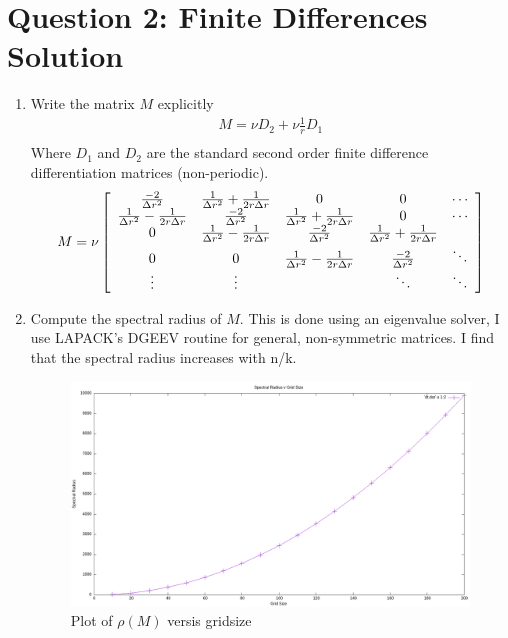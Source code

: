 \documentclass{article}
\begin{document}
\section*{Question 2: Finite Differences Solution}
\begin{enumerate}[label=\alph*)]

    \item Write the matrix $M$ explicitly
    \begin{align*}
        M = \nu D_2 + \nu \frac{1}{r}D_1\\
    \end{align*}
    Where $D_1$ and $D_2$ are the standard second order finite difference
    differentiation matrices (non-periodic).
    \begin{align*}
        M = \nu\left[\begin{array}{c c c c c}
            \frac{-2}{\Delta r^2} & \frac{1}{\Delta r^2} + \frac{1}{2r\Delta r} &
            0 & 0 & \cdots  \\
            \frac{1}{\Delta r^2} - \frac{1}{2r\Delta r} &
            \frac{-2}{\Delta r^2} & \frac{1}{\Delta r^2} + \frac{1}{2r\Delta r} &
            0  & \cdots \\
            0 & \frac{1}{\Delta r^2} - \frac{1}{2r\Delta r} &
            \frac{-2}{\Delta r^2} & \frac{1}{\Delta r^2} + \frac{1}{2r\Delta r} &
             \\
            0 & 0 &\frac{1}{\Delta r^2} - \frac{1}{2r\Delta r} &
            \frac{-2}{\Delta r^2} & \ddots\\
            \vdots & \vdots &  & \ddots & \ddots 
            \end{array}\right]
    \end{align*}

    \item Compute the spectral radius of $M$. 
    This is done using an eigenvalue solver, I use LAPACK's DGEEV routine for
    general, non-symmetric matrices. I find that the spectral radius increases
    with n/k.
    \begin{figure}[ht]
        \centering
        \includegraphics[width=.8\textwidth]{spectal.png}
        \caption{Plot of $\rho(M)$ versis gridsize}
    \end{figure}


\end{enumerate}
\end{document}
